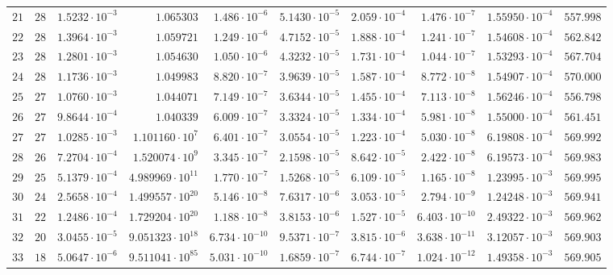 {\begin{longtable}{@{}rrrrrrrrrr@{}}
$21$ & $28$ & $1.5232\cdot10^{-3}$ & $1.065303$ & $1.486\cdot10^{-6}$ & $5.1430\cdot10^{-5}$ & $2.059\cdot10^{-4}$ & $1.476\cdot10^{-7}$ & $1.55950\cdot10^{-4}$ & $557.998$\\
$22$ & $28$ & $1.3964\cdot10^{-3}$ & $1.059721$ & $1.249\cdot10^{-6}$ & $4.7152\cdot10^{-5}$ & $1.888\cdot10^{-4}$ & $1.241\cdot10^{-7}$ & $1.54608\cdot10^{-4}$ & $562.842$\\
$23$ & $28$ & $1.2801\cdot10^{-3}$ & $1.054630$ & $1.050\cdot10^{-6}$ & $4.3232\cdot10^{-5}$ & $1.731\cdot10^{-4}$ & $1.044\cdot10^{-7}$ & $1.53293\cdot10^{-4}$ & $567.704$\\
$24$ & $28$ & $1.1736\cdot10^{-3}$ & $1.049983$ & $8.820\cdot10^{-7}$ & $3.9639\cdot10^{-5}$ & $1.587\cdot10^{-4}$ & $8.772\cdot10^{-8}$ & $1.54907\cdot10^{-4}$ & $570.000$\\
$25$ & $27$ & $1.0760\cdot10^{-3}$ & $1.044071$ & $7.149\cdot10^{-7}$ & $3.6344\cdot10^{-5}$ & $1.455\cdot10^{-4}$ & $7.113\cdot10^{-8}$ & $1.56246\cdot10^{-4}$ & $556.798$\\
$26$ & $27$ & $9.8644\cdot10^{-4}$ & $1.040339$ & $6.009\cdot10^{-7}$ & $3.3324\cdot10^{-5}$ & $1.334\cdot10^{-4}$ & $5.981\cdot10^{-8}$ & $1.55000\cdot10^{-4}$ & $561.451$\\
$27$ & $27$ & $1.0285\cdot10^{-3}$ & $1.101160\cdot10^{7}$ & $6.401\cdot10^{-7}$ & $3.0554\cdot10^{-5}$ & $1.223\cdot10^{-4}$ & $5.030\cdot10^{-8}$ & $6.19808\cdot10^{-4}$ & $569.992$\\
$28$ & $26$ & $7.2704\cdot10^{-4}$ & $1.520074\cdot10^{9}$ & $3.345\cdot10^{-7}$ & $2.1598\cdot10^{-5}$ & $8.642\cdot10^{-5}$ & $2.422\cdot10^{-8}$ & $6.19573\cdot10^{-4}$ & $569.983$\\
$29$ & $25$ & $5.1379\cdot10^{-4}$ & $4.989969\cdot10^{11}$ & $1.770\cdot10^{-7}$ & $1.5268\cdot10^{-5}$ & $6.109\cdot10^{-5}$ & $1.165\cdot10^{-8}$ & $1.23995\cdot10^{-3}$ & $569.995$\\
$30$ & $24$ & $2.5658\cdot10^{-4}$ & $1.499557\cdot10^{20}$ & $5.146\cdot10^{-8}$ & $7.6317\cdot10^{-6}$ & $3.053\cdot10^{-5}$ & $2.794\cdot10^{-9}$ & $1.24248\cdot10^{-3}$ & $569.941$\\
$31$ & $22$ & $1.2486\cdot10^{-4}$ & $1.729204\cdot10^{20}$ & $1.188\cdot10^{-8}$ & $3.8153\cdot10^{-6}$ & $1.527\cdot10^{-5}$ & $6.403\cdot10^{-10}$ & $2.49322\cdot10^{-3}$ & $569.962$\\
$32$ & $20$ & $3.0455\cdot10^{-5}$ & $9.051323\cdot10^{18}$ & $6.734\cdot10^{-10}$ & $9.5371\cdot10^{-7}$ & $3.815\cdot10^{-6}$ & $3.638\cdot10^{-11}$ & $3.12057\cdot10^{-3}$ & $569.903$\\
$33$ & $18$ & $5.0647\cdot10^{-6}$ & $9.511041\cdot10^{85}$ & $5.031\cdot10^{-10}$ & $1.6859\cdot10^{-7}$ & $6.744\cdot10^{-7}$ & $1.024\cdot10^{-12}$ & $1.49358\cdot10^{-3}$ & $569.905$\\
\end{longtable}
}

